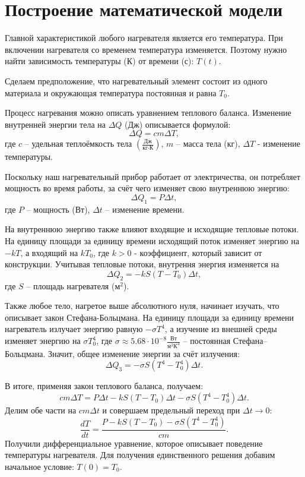 \section{Построение математической модели}
    Главной характеристикой любого нагревателя является его температура. При включении нагревателя со временем температура изменяется. Поэтому нужно найти зависимость температуры (К) от времени (с): $ T(t) $.

    Сделаем предположение, что нагревательный элемент состоит из одного материала и окружающая температура постоянная и равна $T_0$.%
    
    Процесс нагревания можно описать уравнением теплового баланса. Изменение внутренней энергии тела на $ \Delta Q $ (Дж) описывается формулой:
    \[
        \Delta Q = cm \Delta T,
    \]
    где $c$ -- удельная теплоёмкость тела $\left(\frac{\text{Дж}}{\text{кг} \cdot \text{К}}\right)$, $m$ -- масса тела (кг), $ \Delta T $ - изменение температуры.

    Поскольку наш нагревательный прибор работает от электричества, он потребляет мощность во время работы, за счёт чего изменяет свою внутреннюю энергию:
    \[
        \Delta Q_1 = P \Delta t,
    \]
    где $P$ -- мощность (Вт), $\Delta t$ -- изменение времени. 

    На внутреннюю энергию также влияют входящие и исходящие тепловые потоки. На единицу площади за единицу времени исходящий поток изменяет энергию на $ -k T $, а входящий на $ k T_0 $, где $ k > 0$ - коэффициент, который зависит от конструкции. Учитывая тепловые потоки, внутрення энергия изменяется на
    \[
        \Delta Q_2 = -k S (T - T_0) \Delta t,
    \]
    где $S$ -- площадь нагревателя ($\text{м}^2$).

    Также любое тело, нагретое выше абсолютного нуля, начинает изучать, что описывает закон Стефана-Больцмана. На единицу площади за единицу времени нагреватель излучает энергию равную $ -\sigma T^4 $, а изучение из внешней среды изменяет энергию на $ \sigma T_0^4 $, где $\sigma \approx 5.68 \cdot 10^{-8} \frac{\text{Вт}}{\text{м}^2 \text{К}^4}$ -- постоянная Стефана--Больцмана. Значит, общее изменение энергии за счёт излучения:
    \[
        \Delta Q_3 = -\sigma S (T^4 - T_0^4) \Delta t.
    \]


    В итоге, применяя закон теплового баланса, получаем:
    \[
        cm\Delta T = P \Delta t - k S (T - T_0) \Delta t - \sigma S (T^4 - T_0^4) \Delta t.
    \]
    Делим обе части на $ cm \Delta t $ и совершаем предельный переход при $ \Delta t \to 0 $:
    \[
        \frac{dT}{dt} = \frac{ P - k S (T - T_0) - \sigma S (T^4 - T_0^4) }{cm}.
    \]
    Получили дифференциальное уравнение, которое описывает поведение температуры нагревателя. Для получения единственного решения добавим начальное условие: \( T(0) = T_0 \).

